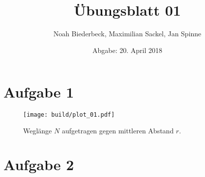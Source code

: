 \documentclass{scrartcl}
\title{Übungsblatt 01}
\author{%
  Noah Biederbeck, Maximilian Sackel, Jan Spinne
}
\date{Abgabe: 20. April 2018}
\begin{document}
\maketitle

\section*{Aufgabe 1}
\begin{figure}[h]
  \centering
  \texttt{[image: build/plot\_01.pdf]}
  \caption{Weglänge $N$ aufgetragen gegen mittleren Abstand $r$.}%
  \label{fig:build/plot_01}
\end{figure}
\section*{Aufgabe 2}
\end{document}
